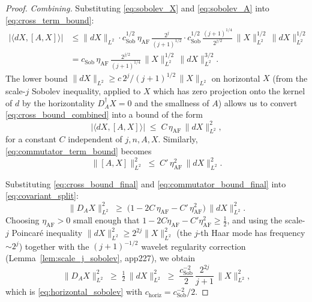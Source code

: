\begin{proof}
\emph{Combining.} Substituting \eqref{eq:sobolev_X} and
\eqref{eq:sobolev_A} into \eqref{eq:cross_term_bound}:
\begin{align}
\label{eq:cross_bound_combined}
  |\langle dX,[A,X]\rangle|
  &\le\|dX\|_{L^{2}}\cdot c_{\mathrm{Sob}}^{1/2}\,
  \eta_{\mathrm{AF}}\,\frac{2^{j}}{(j+1)^{1/2}}\cdot
  c_{\mathrm{Sob}}^{1/2}\,\frac{(j+1)^{1/4}}{2^{j/2}}\,
  \|X\|_{L^{2}}^{1/2}\,\|dX\|_{L^{2}}^{1/2}\\
  &=c_{\mathrm{Sob}}\,\eta_{\mathrm{AF}}\,
  \frac{2^{j/2}}{(j+1)^{1/4}}\,
  \|X\|_{L^{2}}^{1/2}\,\|dX\|_{L^{2}}^{3/2}.
\end{align}
The lower bound $\|dX\|_{L^{2}}\ge c\,2^{j}/(j+1)^{1/2}\,
\|X\|_{L^{2}}$ on horizontal $X$ (from the scale-$j$ Sobolev
inequality, applied to $X$ which has zero projection onto the
kernel of $d$ by the horizontality $D_{A}^{\dagger}X=0$ and
the smallness of $A$) allows us to convert
\eqref{eq:cross_bound_combined} into a bound of the form
\begin{equation}
\label{eq:cross_bound_final}
  |\langle dX,[A,X]\rangle|
  \;\le\;C\,\eta_{\mathrm{AF}}\,\|dX\|_{L^{2}}^{2},
\end{equation}
for a constant $C$ independent of $j,n,A,X$. Similarly,
\eqref{eq:commutator_term_bound} becomes
\begin{equation}
\label{eq:commutator_bound_final}
  \|[A,X]\|_{L^{2}}^{2}
  \;\le\;C'\,\eta_{\mathrm{AF}}^{2}\,\|dX\|_{L^{2}}^{2}.
\end{equation}

Substituting \eqref{eq:cross_bound_final} and
\eqref{eq:commutator_bound_final} into
\eqref{eq:covariant_split}:
\begin{equation}
\label{eq:covariant_lower}
  \|D_{A}X\|_{L^{2}}^{2}
  \;\ge\;\bigl(1-2C\,\eta_{\mathrm{AF}}-C'\,\eta_{\mathrm{AF}}^{2}\bigr)\,
  \|dX\|_{L^{2}}^{2}.
\end{equation}
Choosing $\eta_{\mathrm{AF}}>0$ small enough that
$1-2C\eta_{\mathrm{AF}}-C'\eta_{\mathrm{AF}}^{2}\ge\tfrac{1}{2}$,
and using the scale-$j$ Poincar\'e inequality
$\|dX\|_{L^{2}}^{2}\ge 2^{2j}\|X\|_{L^{2}}^{2}$ (the
$j$-th Haar mode has frequency $\sim 2^{j}$) together with the
$(j+1)^{-1/2}$ wavelet regularity correction
(Lemma~\ref{lem:scale_j_sobolev}, app227), we obtain
\begin{equation}
\label{eq:horizontal_sobolev_final}
  \|D_{A}X\|_{L^{2}}^{2}
  \;\ge\;\tfrac{1}{2}\,\|dX\|_{L^{2}}^{2}
  \;\ge\;\frac{c_{\mathrm{Sob}}^{-2}}{2}\,
  \frac{2^{2j}}{j+1}\,\|X\|_{L^{2}}^{2},
\end{equation}
which is \eqref{eq:horizontal_sobolev} with
$c_{\mathrm{horiz}}=c_{\mathrm{Sob}}^{-2}/2$.
\end{proof}

